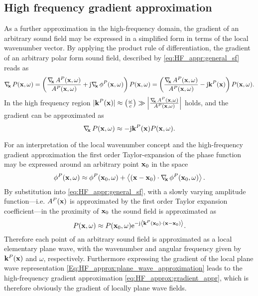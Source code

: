 \subsection{High frequency gradient approximation}
As a further approximation in the high-frequency domain, the gradient of an arbitrary sound field may be expressed in a simplified form in terms of the local wavenumber vector.
By applying the product rule of differentiation, the gradient of an arbitrary polar form sound field, described by \eqref{eq:HF_appr:general_sf} reads as
\begin{equation}
\Dx P(\vx,\omega) = \left(  \frac{\Dx A^P(\vx,\omega)}{A^P(\vx,\omega)} + \ti \Dx \phi^P(\vx,\omega) \right) P(\vx,\omega) =  \left(  \frac{\Dx A^P(\vx,\omega)}{A^P(\vx,\omega)} - \ti \vk^P(\vx) \right) P(\vx,\omega).
\end{equation}
In the high frequency region $|\mathbf{k}^P(\mathbf{x})| \approx \left( \frac{\omega}{c} \right) \gg \left| \frac{ \nabla_{\!\!\mathbf{x}}\, A^P(\mathbf{x},\omega)}{A^P(\mathbf{x},\omega)} \right|$ holds, and the gradient can be approximated as
\begin{equation}
\nabla_{\!\!\mathbf{x}}\, P(\mathbf{x},\omega) \approx - \mathrm{j} \mathbf{k}^P(\mathbf{x}) P(\mathbf{x},\omega).
\label{eq:HF_approx:gradient_appr}
\end{equation}

\vspace{3mm}
For an interpretation of the local wavenumber concept and the high-frequency gradient approximation the first order Taylor-expansion of the phase function may be expressed around an arbitrary point $\mathbf{x}_0$ in the space
\begin{equation}
\phi^P(\mathbf{x},\omega) \approx \phi^P(\mathbf{x}_0,\omega) + \left< (\mathbf{x}-\mathbf{x}_0) \cdot \nabla_{\!\!\mathbf{x}}\, \phi^P(\mathbf{x}_0,\omega) \right>.
\end{equation}
By substitution into \eqref{eq:HF_appr:general_sf}, with a slowly varying amplitude function---i.e. $A^P(\mathbf{x})$ is approximated by the first order Taylor expansion coefficient---in the proximity of $\mathbf{x}_0$ the sound field is approximated as
\begin{equation}
\label{Eq:HF_approx:plane_wave_approximation}
P(\mathbf{x},\omega) \approx P(\mathbf{x}_0,\omega) \mathrm{e}^{-\mathrm{j}  \left< \mathbf{k}^P(\mathbf{x}_0) \cdot \left( \mathbf{x} - \mathbf{x}_0 \right) \right>}.
\end{equation}
Therefore each point of an arbitrary sound field is approximated as a local elementary plane wave, with the wavenumber and angular frequency given by $\mathbf{k}^P(\mathbf{x})$ and $\omega$, respectively.
Furthermore expressing the gradient of the local plane wave representation \eqref{Eq:HF_approx:plane_wave_approximation} leads to the high-frequency gradient approximation \eqref{eq:HF_approx:gradient_appr}, which is therefore obviously the gradient of locally plane wave fields.

